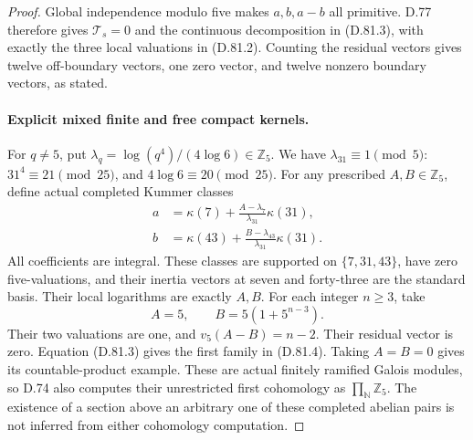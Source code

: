 \begin{proof}
Global independence modulo five makes \(a,b,a-b\)
all primitive. D.77 therefore gives
\(\mathcal T_s=0\) and the continuous decomposition in
(D.81.3), with exactly the three local valuations in
(D.81.2). Counting the residual vectors gives twelve
off-boundary vectors, one zero vector, and twelve
nonzero boundary vectors, as stated.

\paragraph{Explicit mixed finite and free compact kernels.}
For \(q\ne5\), put
\(\lambda_q=\log(q^4)/(4\log6)\in\mathbb Z_5\).
We have \(\lambda_{31}\equiv1\pmod5\):
\(31^4\equiv21\pmod{25}\), and \(4\log6\equiv20\pmod{25}\).
For any prescribed \(A,B\in\mathbb Z_5\), define actual
completed Kummer classes
\[
 \begin{split}
 a&=\kappa(7)+
       \frac{A-\lambda_7}{\lambda_{31}}\kappa(31),\\
 b&=\kappa(43)+
       \frac{B-\lambda_{43}}{\lambda_{31}}\kappa(31).
 \end{split}                                                 \tag{D.81.20}
\]
All coefficients are integral. These classes are supported
on \(\{7,31,43\}\), have zero five-valuations, and their
inertia vectors at seven and forty-three are the standard
basis. Their local logarithms are exactly \(A,B\).
For each integer \(n\ge3\), take
\[
                 A=5,\qquad B=5(1+5^{n-3}).
                                                               \tag{D.81.21}
\]
Their two valuations are one, and
\(v_5(A-B)=n-2\). Their residual vector is zero.
Equation (D.81.3) gives the first family in (D.81.4).
Taking \(A=B=0\) gives its countable-product example.
These are actual finitely ramified Galois modules, so
D.74 also computes their unrestricted first cohomology
as \(\prod_{\mathbb N}\mathbb Z_5\).
The existence of a section above an arbitrary one of
these completed abelian pairs is not inferred from
either cohomology computation.
\end{proof}
